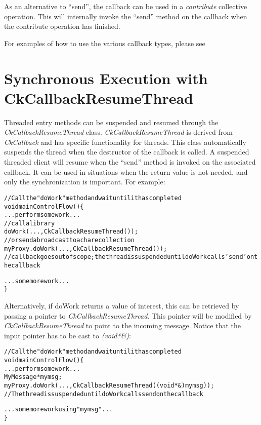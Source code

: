 As an alternative to ``send'', the callback can be used in a {\em
  contribute} collective operation. This will internally invoke the
``send'' method on the callback when the contribute operation has
finished.

For examples of how to use the various callback types, please
see 

\section{Synchronous Execution with CkCallbackResumeThread}

\label{sec:ckcallbackresumethread}

Threaded entry methods can be suspended and resumed through the {\em
  CkCallbackResumeThread} class. {\em CkCallbackResumeThread} is
derived from {\em CkCallback} and has specific functionality for
threads.  This class automatically suspends the thread when the
destructor of the callback is called.  A suspended threaded client
will resume when the ``send'' method is invoked on the associated
callback.  It can be used in situations when the return value is not
needed, and only the synchronization is important. For example:

\begin{alltt}
// Call the "doWork" method and wait until it has completed
void mainControlFlow() \{
  ...perform some work...
  // call a library
  doWork(...,CkCallbackResumeThread());
  // or send a broadcast to a chare collection
  myProxy.doWork(...,CkCallbackResumeThread());
  // callback goes out of scope; the thread is suspended until doWork calls 'send' on the callback
  
  ...some more work...
\}
\end{alltt}

Alternatively, if doWork returns a value of interest, this can be retrieved by
passing a pointer to {\em CkCallbackResumeThread}. This pointer will be modified
by {\em CkCallbackResumeThread} to point to the incoming message. Notice that
the input pointer has to be cast to {\em (void*\&)}:

\begin{alltt}
// Call the "doWork" method and wait until it has completed
void mainControlFlow() \{
  ...perform some work...
  MyMessage *mymsg;
  myProxy.doWork(...,CkCallbackResumeThread((void*\&)mymsg));
  // The thread is suspended until doWork calls send on the callback

  ...some more work using "mymsg"...
\}
\end{alltt}

